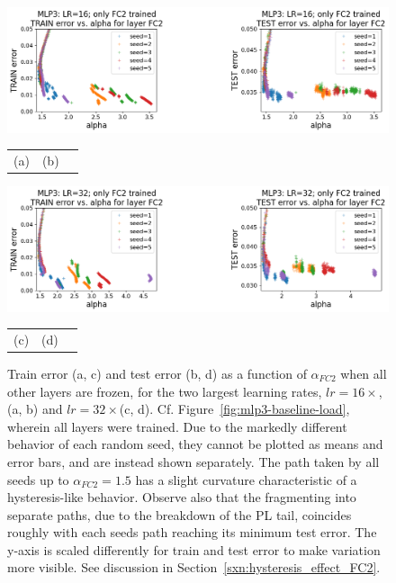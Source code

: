 \begin{figure}[t] %
    \centering
        \includegraphics[width=12cm]{img/alpha_by_epochs/mlp3_error_by_LR=16_FC2_FC2.png}
    \begin{tabular}{ccc}
      (a)\hspace{5cm} & (b) \\
    \end{tabular}
        \includegraphics[width=12cm]{img/alpha_by_epochs/mlp3_error_by_LR=32_FC2_FC2.png}
    \begin{tabular}{ccc}
      (c)\hspace{5cm} & (d) \\
    \end{tabular}
        \caption{Train error (a, c) and test error (b, d) as a function of $\alpha_{FC2}$ when all other layers are 
        frozen, for the two largest learning rates, $lr=16\times$, (a, b) and $lr=32\times$(c, d). Cf. 
        Figure~\ref{fig:mlp3-baseline-load}, wherein all layers were trained. Due to the markedly different 
        behavior of each random seed, they cannot be plotted as means and error bars, and are instead shown separately. 
        The path taken by all seeds up to $\alpha_{FC2} = 1.5$ has a slight curvature characteristic of a 
        hysteresis-like behavior. Observe also that the fragmenting into separate paths, due to the breakdown of the 
        PL tail, coincides roughly with each seeds path reaching its minimum test error. The y-axis is scaled 
        differently for train and test error to make variation more visible. See discussion in 
        Section~\ref{sxn:hysteresis_effect_FC2}.
    }
    \label{fig:mlp3-FC2-alpha-hysteresis}
\end{figure}

